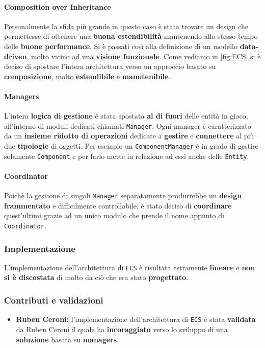 \paragraph{Composition over Inheritance}
Personalmente la sfida più grande in questo caso è stata trovare un design che permettesse di ottenere una \textbf{buona estendibilità} mantenendo allo stesso tempo delle \textbf{buone performance}. Si è passati così alla definizione di un modello \textbf{data-driven}, molto vicino ad una \textbf{visione funzionale}. Come vediamo in \ref{fig:ECS} si è deciso di spostare l'intera architettura verso un approccio basato su \textbf{composizione}, molto \textbf{estendibile} e \textbf{manutenibile}. 

\paragraph{Managers}
L'intera \textbf{logica di gestione} è stata spostata \textbf{al di fuori} delle entità in gioco, all'interno di moduli dedicati chiamati \texttt{Manager}. Ogni manager è caratterizzato da un \textbf{insieme ridotto di operazioni} dedicate a \textbf{gestire} e \textbf{connettere} al più due \textbf{tipologie} di oggetti. Per esempio un \texttt{ComponentManager} è in grado di gestire solamente \texttt{Component} e per farlo mette in relazione ad essi anche delle \texttt{Entity}.

\paragraph{Coordinator}
Poichè la gestione di singoli \texttt{Manager} separatamente produrrebbe un \textbf{design frammentato} e difficilmente controllabile, è stato deciso di \textbf{coordinare} quest'ultimi grazie ad un unico modulo che prende il nome appunto di\\ \texttt{Coordinator}.

\subsubsection{Implementazione}
L'implementazione dell'architettura di \texttt{ECS} è risultata estramente \textbf{lineare} e \textbf{non si è discostata} di molto da ciò che era stato \textbf{progettato}.

\subsubsection{Contributi e validazioni}
\begin{itemize}
	\item{\textbf{Ruben Ceroni:}} l'implementazione dell'architettura di \texttt{ECS} è stata \textbf{validata} da Ruben Ceroni il quale ha \textbf{incoraggiato} verso lo sviluppo di una \textbf{soluzione} basata su \textbf{managers}.
\end{itemize}

